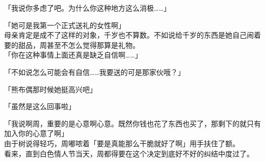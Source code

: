 「我说你多虑了吧。为什么你这种地方这么消极……」

「她可是我第一个正式送礼的女性啊」\\

母亲肯定是成不了这样的对象，千岁也不算数。不如说给千岁的东西是她自己闹着要的甜品，周甚至不怎么觉得那算是礼物。\\

「你在这种事情上面还真是缺乏自信啊……」

「不如说怎么可能会有自信……我要送的可是那家伙哦？」

「熊布偶那时候她挺高兴吧」

「虽然是这么回事啦」

「我说啊周，重要的是心意啊心意。既然你钱也花了东西也买了，那剩下的就只有加入你的心意了啊」\\

由于树说得轻巧，周嘟哝着「要是真能那么干脆就好了啊」用手扶住了额。\\

看来，直到白色情人节当天，周都得要在这个决定到底好不好的纠结中度过了。
